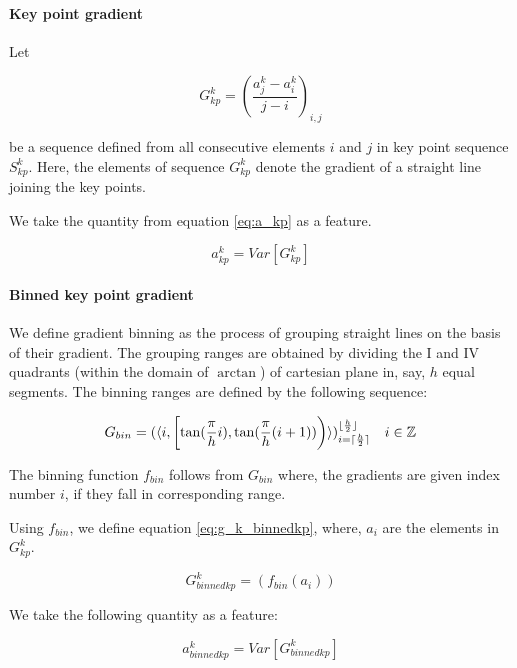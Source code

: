 \documentclass[5p]{elsarticle}
\begin{document}
\paragraph{Key point gradient}
Let

\begin{equation} \label{eq:gk_kp}
G^k_{kp} = (\frac{a^k_j-a^k_i}{j-i})_{i,j}
\end{equation}


be a sequence defined from all consecutive elements $i$ and $j$ in key point sequence $S^k_{kp}$. Here, the elements of sequence $G^k_{kp}$ denote the gradient of a straight line joining the key points.

We take the quantity from equation \ref{eq:a_kp} as a feature.

\begin{equation} \label{eq:a_kp}
a_{kp}^k = Var[G^k_{kp}]
\end{equation}


\paragraph{Binned key point gradient}
We define gradient binning as the process of grouping straight lines on the basis of their gradient. The grouping ranges are obtained by dividing the I and IV quadrants (within the domain of $\arctan$) of cartesian plane in, say, $h$ equal segments. The binning ranges are defined by the following sequence:

\begin{equation} \label{eq:gbin}
G_{bin} = (\langle i, \intco{\tan(\frac{\pi}{h}i), \tan(\frac{\pi}{h}(i+1))} \rangle)_{i=\lceil\frac{h}{2}\rceil}^{\lfloor\frac{h}{2}\rfloor} \quad i \in \mathbb{Z}
\end{equation}


The binning function $f_{bin}$ follows from $G_{bin}$ where, the gradients are given index number $i$, if they fall in corresponding range.

Using $f_{bin}$, we define equation \ref{eq:g_k_binnedkp}, where, $a_i$ are the elements in $G^k_{kp}$.

\begin{equation} \label{eq:g_k_binnedkp}
G^k_{binned kp} = (f_{bin}(a_i))
\end{equation}


We take the following quantity as a feature:

\begin{equation} \label{eq:a_bin_kp}
a_{binnedkp}^k = Var[G^k_{binned kp}]
\end{equation}
\end{document}
